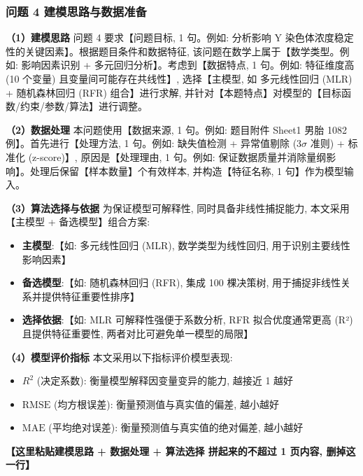 
\subsubsection{问题 4 建模思路与数据准备}

\textbf{（1）建模思路} \quad 问题 4 要求【问题目标, 1 句。例如: 分析影响 Y 染色体浓度稳定性的关键因素】。根据题目条件和数据特征, 该问题在数学上属于【数学类型。例如: 影响因素识别 + 多元回归分析】。考虑到【数据特点, 1 句。例如: 特征维度高 (10 个变量) 且变量间可能存在共线性】, 选择【主模型, 如 多元线性回归 (MLR) + 随机森林回归 (RFR) 组合】进行求解, 并针对【本题特点】对模型的【目标函数/约束/参数/算法】进行调整。

\textbf{（2）数据处理} \quad 本问题使用【数据来源, 1 句。例如: 题目附件 Sheet1 男胎 1082 例】。首先进行【处理方法, 1 句。例如: 缺失值检测 + 异常值剔除 (3$\sigma$ 准则) + 标准化 (z-score)】, 原因是【处理理由, 1 句。例如: 保证数据质量并消除量纲影响】。处理后保留【样本数量】个有效样本, 并构造【特征名称, 1 句】作为模型输入。

\textbf{（3）算法选择与依据} \quad 为保证模型可解释性, 同时具备非线性捕捉能力, 本文采用【主模型 + 备选模型】组合方案:
\begin{itemize}
  \item \textbf{主模型}:【如: 多元线性回归 (MLR), 数学类型为线性回归, 用于识别主要线性影响因素】
  \item \textbf{备选模型}:【如: 随机森林回归 (RFR), 集成 100 棵决策树, 用于捕捉非线性关系并提供特征重要性排序】
  \item \textbf{选择依据}:【如: MLR 可解释性强便于系数分析, RFR 拟合优度通常更高 (R²) 且提供特征重要性, 两者对比可避免单一模型的局限】
\end{itemize}

\textbf{（4）模型评价指标} \quad 本文采用以下指标评价模型表现:
\begin{itemize}
  \item $R^2$ (决定系数): 衡量模型解释因变量变异的能力, 越接近 1 越好
  \item $\text{RMSE}$ (均方根误差): 衡量预测值与真实值的偏差, 越小越好
  \item $\text{MAE}$ (平均绝对误差): 衡量预测值与真实值的绝对偏差, 越小越好
\end{itemize}

\textbf{【这里粘贴建模思路 + 数据处理 + 算法选择 拼起来的不超过 1 页内容, 删掉这一行】}

